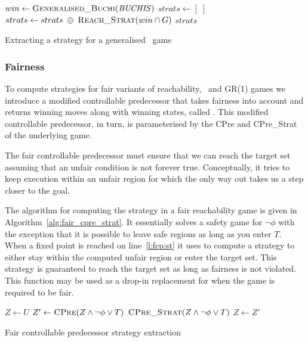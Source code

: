\begin{algorithm}
\begin{algorithmic}[1]

\State $win \gets \Call{Generalised\_Buchi}{\genbuchiobj}$ \label{l:gbs:wr}
    \State $strats \gets [\;]$
        \State $strats \gets strats \; \oplus \; \Call{Reach\_Strat}{win \cap G}$ \label{l:gbs:rs}
    \EndFor
    \State \Return $strats$
\EndFunction

\end{algorithmic}
\caption{Extracting a strategy for a generalised \buchi\ game}
\label{alg:gen_buchi_strat}
\end{algorithm}

\subsubsection{Fairness}

To compute strategies for fair variants of reachability, \buchi\ and GR(1) games we introduce a modified controllable predecessor that takes fairness into account and returns winning moves along with winning states, called . This modified controllable predecessor, in turn, is parameterised by the CPre and CPre\_Strat of the underlying game.

The fair controllable predecessor must ensure that we can reach the target set assuming that an unfair condition is not forever true. Conceptually, it tries to keep execution within an unfair region for which the only way out takes us a step closer to the goal. 

The algorithm for computing the strategy in a fair reachability game is given in Algorithm~\ref{alg:fair_cpre_strat}. It essentially solves a safety game for $\neg\phi$ with the exception that it is possible to leave safe regions as long as you enter $T$. When a fixed point is reached on line~\ref{l:fcp:st} it uses  to compute a strategy to either stay within the computed unfair region or enter the target set. This strategy is guaranteed to reach the target set as long as fairness is not violated. This function may be used as a drop-in replacement for  when the game is required to be fair.

\begin{algorithm}
\begin{algorithmic}[1]

    \State $Z \gets U$
    \Loop
        \State $Z' \gets \Call{CPre}{Z \wedge \neg\phi \vee T}$
        \State\Return $\Call{CPre\_Strat}{Z \wedge \neg\phi \vee T}$ \label{l:fcp:st}
        \EndIf
        \State $Z \gets Z'$
    \EndLoop
\EndFunction

\end{algorithmic}
\caption{Fair controllable predecessor strategy extraction}
\label{alg:fair_cpre_strat}
\end{algorithm}

